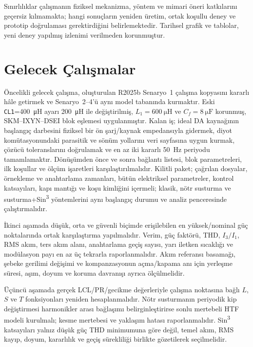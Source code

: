 Sınırlılıklar çalışmanın fiziksel mekanizma, yöntem ve mimari öneri katkılarını geçersiz kılmamakta; hangi sonuçların yeniden üretim, ortak koşullu deney ve prototip doğrulaması gerektirdiğini belirlemektedir. Tarihsel grafik ve tablolar, yeni deney yapılmış izlenimi verilmeden korunmuştur.


\section{Gelecek Çalışmalar}

Öncelikli gelecek çalışma, oluşturulan R2025b Senaryo~1 çalışma kopyasını kararlı hâle getirmek ve Senaryo~2--4'ü aynı model tabanında kurmaktır. Eski \texttt{CL1}=\SI{400}{\micro\henry} ayarı \SI{200}{\micro\henry} ile değiştirilmiş, $L_1=\SI{600}{\micro\henry}$ ve $C_f=\SI{8}{\micro\farad}$ korunmuş, SKM--IXYN--DSEI blok eşlemesi uygulanmıştır. Kalan iş; ideal DA kaynağının başlangıç darbesini fiziksel bir ön şarj/kaynak empedansıyla gidermek, diyot komütasyonundaki parasitik ve sönüm yollarını veri sayfasına uygun kurmak, çözücü toleranslarını doğrulamak ve en az iki kararlı \SI{50}{\hertz} periyodu tamamlamaktır. Dönüşümden önce ve sonra bağlantı listesi, blok parametreleri, ilk koşullar ve ölçüm işaretleri karşılaştırılmalıdır. Kilitli paket; çağrılan dosyalar, örnekleme ve anahtarlama zamanları, bütün elektriksel parametreler, kontrol katsayıları, kapı mantığı ve koşu kimliğini içermeli; klasik, nötr susturma ve susturma+Sin\textsuperscript{3} yöntemlerini aynı başlangıç durumu ve analiz penceresinde çalıştırmalıdır.

İkinci aşamada düşük, orta ve güvenli biçimde erişilebilen en yüksek/nominal güç noktalarında ortak karşılaştırma yapılmalıdır. Verim, güç faktörü, THD, $I_3/I_1$, RMS akım, ters akım alanı, anahtarlama geçiş sayısı, yarı iletken sıcaklığı ve modülasyon payı en az üç tekrarla raporlanmalıdır. Akım referansı basamağı, şebeke gerilimi değişimi ve kompanzasyonun açma/kapama anı için yerleşme süresi, aşım, doyum ve koruma davranışı ayrıca ölçülmelidir.

Üçüncü aşamada gerçek LCL/PR/gecikme değerleriyle çalışma noktasına bağlı $L$, $S$ ve $T$ fonksiyonları yeniden hesaplanmalıdır. Nötr susturmanın periyodik kip değiştirmesi harmonikler arası bağlaşımı belirginleştirirse sonlu mertebeli HTF modeli kurulmalı; kesme mertebesi ve yaklaşım hatası raporlanmalıdır. Sin\textsuperscript{3} katsayıları yalnız düşük güç THD minimumuna göre değil, temel akım, RMS kayıp, doyum, kararlılık ve geçiş sürekliliği birlikte gözetilerek seçilmelidir.

